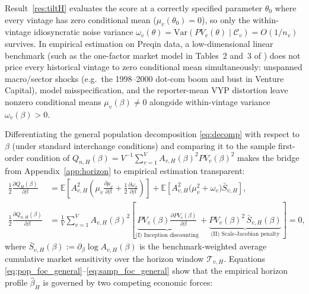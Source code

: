 \documentclass[11pt]{article}
\newcommand{\E}{\mathbb{E}}
\newcommand{\Var}{\mathrm{Var}}
\newcommand{\code}[1]{\texttt{\detokenize{#1}}}
\theoremstyle{plain}
\theoremstyle{definition}
\begin{document}
Result~\ref{res:tiltH} evaluates the score at a correctly specified parameter $\theta_0$ where every vintage has zero conditional mean ($\mu_v(\theta_0)=0$), so only the within-vintage idiosyncratic noise variance $\omega_v(\theta)=\Var(PV_v(\theta)\mid\mathcal C_v)=O(1/n_v)$ survives. In empirical estimation on Preqin data, a low-dimensional linear benchmark (such as the one-factor market model in Tables~2 and~3 of \code{sdf_paper.tex}) does not price every historical vintage to zero conditional mean simultaneously: unspanned macro/sector shocks (e.g.\ the 1998--2000 dot-com boom and bust in Venture Capital), model misspecification, and the reporter-mean VYP distortion leave nonzero conditional means $\mu_v(\beta)\ne 0$ alongside within-vintage variance $\omega_v(\beta)>0$.

Differentiating the general population decomposition \eqref{eq:decomp} with respect to $\beta$ (under standard interchange conditions) and comparing it to the sample first-order condition of $Q_{n,H}(\beta)=V^{-1}\sum_{v=1}^V A_{v,H}(\beta)^2 PV_v(\beta)^2$ makes the bridge from Appendix~\ref{app:horizon} to empirical estimation transparent:
\begin{align}
\label{eq:pop_foc_general}
\frac{1}{2}\frac{\partial Q_H(\beta)}{\partial\beta}
&=\E\!\left[A_{v,H}^2\left(\mu_v\frac{\partial\mu_v}{\partial\beta}+\frac{1}{2}\frac{\partial\omega_v}{\partial\beta}\right)\right]
+\E\!\left[A_{v,H}^2\bigl(\mu_v^2+\omega_v\bigr)\bar S_{v,H}\right],\\
\label{eq:samp_foc_general}
\frac{1}{2}\frac{\partial Q_{n,H}(\beta)}{\partial\beta}
&=\frac{1}{V}\sum_{v=1}^V A_{v,H}(\beta)^2\left[
\underbrace{PV_v(\beta)\frac{\partial PV_v(\beta)}{\partial\beta}}_{\text{(I) Inception discounting}}
+\underbrace{PV_v(\beta)^2\,\bar S_{v,H}(\beta)}_{\text{(II) Scale-Jacobian penalty}}
\right]=0,
\end{align}
where $\bar S_{v,H}(\beta):=\partial_\beta\log A_{v,H}(\beta)$ is the benchmark-weighted average cumulative market sensitivity over the horizon window $\mathcal T_{v,H}$. Equations \eqref{eq:pop_foc_general}--\eqref{eq:samp_foc_general} show that the empirical horizon profile $\hat\beta_H$ is governed by two competing economic forces:
\end{document}
